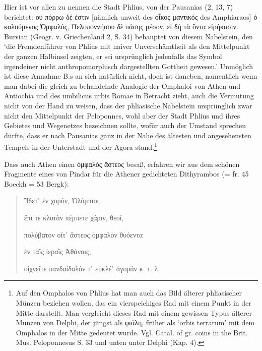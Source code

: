 \documentclass[a4paper, 11pt, oneside]{article}
\begin{document}
Hier ist vor allen zu nennen die Stadt Phlius, von der Pausanias (2, 13, 7) berichtet: οὐ πόρρω δέ ἐστιν [nämlich unweit des οἶκος μαντικός des Amphiaraos] ὁ καλούμενος Ὀμφαλός, Πελοποννήσου δὲ πάσης μέσον, εἰ δὴ τὰ ὄντα εἰρήκασιν. Bursian (Geogr. v. Griechenland 2, S. 34) behauptet von diesem Nabelstein, den `die Fremdenführer von Phlius mit naiver Unverschämtheit als den Mittelpunkt der ganzen Halbinsel zeigten, er sei ursprünglich jedenfalls das Symbol irgendeiner nicht anthropomorphisch dargestellten Gottheit gewesen.' Unmöglich ist diese Annahme B.s an sich natürlich nicht, doch ist daneben, namentlich wenn man dabei die gleich zu behandelnde Analogie der Omphaloi von Athen und Antiochia und des umbilicus urbis Romae in Betracht zieht, auch die Vermutung nicht von der Hand zu weisen, dass der phliasische Nabelstein ursprünglich zwar nicht den Mittelpunkt der Peloponnes, wohl aber der Stadt Phlius und ihres Gebietes und Wegenetzes bezeichnen sollte, wofür auch der Umstand sprechen dürfte, dass er nach Pausanias ganz in der Nahe des ältesten und angesehensten Tempels in der Unterstadt und der Agora stand.\footnote{Auf den Omphalos von Phlius hat man auch das Bild älterer phliasischer Münzen beziehen wollen, das ein vierspeichiges Rad mit einem Punkt in der Mitte darstellt. Man vergleicht dieses Rad mit einem gewissen Typus älterer Münzen von Delphi, der jüngst als φιάλη, früher als `orbis terrarum' mit dem Omphalos in der Mitte gedeutet wurde. Vgl. Catal. of gr. coins in the Brit. Mus. Peloponnesus S. 33 und unten unter Delphi (Kap. 4).}

Dass auch Athen einen ὀμφαλὸς ἄστεος besaß, erfahren wir aus dem schönen Fragmente eines von Pindar für die Athener gedichteten Dithyrambos (= fr. 45 Boeckh = 53 Bergk):
\begin{quotation}
Ἴδετ᾽ ἐν χορόν, Ὀλύμπιοι,

ἔπι τε κλυτὰν πέμπετε χάριν, θεοί,

πολύβατον οἵτ᾽ ἄστεος ὀμφαλὸν θυόεντα

ἐν ταῖς ἰεραῖς Ἀθάναις,

οἰχνεῖτε πανδαίδαλόν τ᾽ εὐκλέ᾽ ἀγοράν κ. τ. λ.
\end{quotation}
\end{document}
